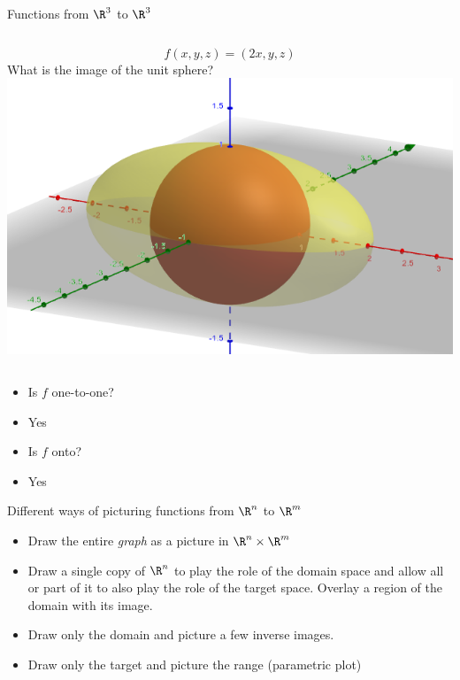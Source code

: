 \documentclass{beamer}
\begin{document}
\begin{frame}{Functions from $\R^3$ to $\R^3$}

\begin{columns}
\column[T]{5cm}
$$f(x,y, z) = (2x, y, z)$$
What is the image of the unit sphere?
\column[T]{5cm}
\includegraphics[scale=0.2]{sphere-to-ellipsoid}
\end{columns}

\begin{itemize}
\item Is $f$ one-to-one?
\item Yes
\item Is $f$ onto?
\item Yes
\end{itemize}
\end{frame}

\begin{frame}{Different ways of picturing functions from $\R^n$ to $\R^m$}


\begin{itemize}
\item Draw the entire \emph{graph} as a picture in $\R^n \times \R^m$
\item Draw a single copy of $\R^n$ to play the role of the domain space
and allow all or part of it to also play the role of the target space.
Overlay a region of the domain with its image.
\item Draw only the domain and picture a few inverse images.
\item Draw only the target and picture the range (parametric plot)
\end{itemize}

\end{frame}
\end{document}
